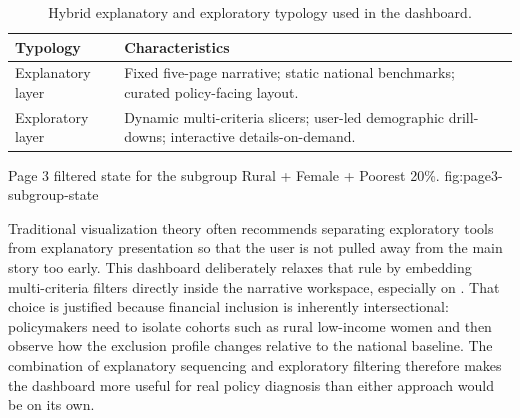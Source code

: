 \documentclass[../main.tex]{subfiles}
\begin{document}
\begin{table}[H]
\centering
\small
\begin{tabularx}{0.92\textwidth}{p{}X}
\toprule
\textbf{Typology} & \textbf{Characteristics} \\
\midrule
Explanatory layer & Fixed five-page narrative; static national benchmarks;
curated policy-facing layout. \\
Exploratory layer & Dynamic multi-criteria slicers; user-led demographic
drill-downs; interactive details-on-demand. \\
\bottomrule
\end{tabularx}
\caption{Hybrid explanatory and exploratory typology used in the dashboard.}
\label{tab:visualization-typology}
\end{table}

{Page 3 filtered state for the subgroup Rural + Female + Poorest 20\%.}
{fig:page3-subgroup-state}

Traditional visualization theory often recommends separating exploratory tools
from explanatory presentation so that the user is not pulled away from the main
story too early. This dashboard deliberately relaxes that rule by embedding
multi-criteria filters directly inside the narrative workspace, especially on
. That choice
is justified because financial inclusion is inherently intersectional:
policymakers need to isolate cohorts such as rural low-income women and then
observe how the exclusion profile changes relative to the national baseline.
The combination of explanatory sequencing and exploratory filtering therefore
makes the dashboard more useful for real policy diagnosis than either approach
would be on its own.
\end{document}
